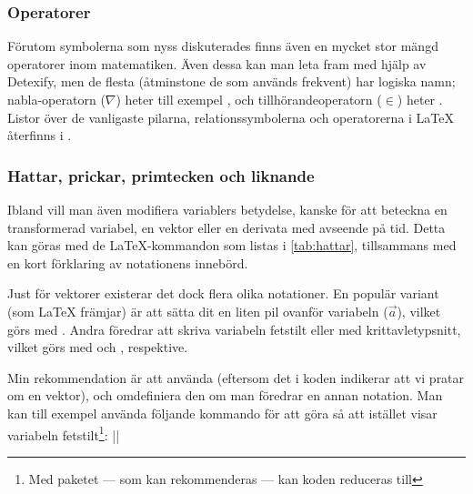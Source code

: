 \documentclass[10pt,../../a4.tex]{subfiles}
\begin{document}
\subsubsection{Operatorer}\label{sec:3:operatorer}%
Förutom symbolerna som nyss diskuterades finns även en
mycket stor mängd operatorer inom matematiken. Även dessa kan man leta
fram med hjälp av Detexify, men de flesta (åtminstone de som används
frekvent) har logiska namn; nabla-operatorn (\(\nabla\)) heter till 
exempel
, och tillhörandeoperatorn (\(\in\)) heter . Listor
över de vanligaste pilarna, relationssymbolerna och operatorerna i 
\LaTeX{} återfinns i . 

\subsubsection{Hattar, prickar, primtecken och liknande}
Ibland vill man även modifiera variablers betydelse, kanske för att
beteckna en transformerad variabel, en vektor 
eller en derivata med avseende på tid.
Detta kan göras med de \LaTeX-kommandon som listas i \cref{tab:hattar},
tillsammans med en kort förklaring av notationens innebörd.

Just för vektorer existerar det dock flera olika notationer. En populär
variant (som \LaTeX{} främjar) är att sätta dit en liten pil ovanför
variabeln (\(\vec{a}\)), vilket görs med . Andra föredrar att
skriva variabeln fetstilt eller med krittavletypsnitt,
vilket görs med  och , respektive.

Min rekommendation är att använda  (eftersom det i
koden indikerar att vi pratar om en vektor), och omdefiniera den om man
föredrar en annan notation. Man kan till exempel använda följande kommando
för att göra så att  istället visar variabeln
fetstilt\footnote{Med paketet  — som kan rekommenderas — kan koden reduceras till }:
\latex|\renewcommand\vec[1]{\boldmath{#1}}|
\end{document}
